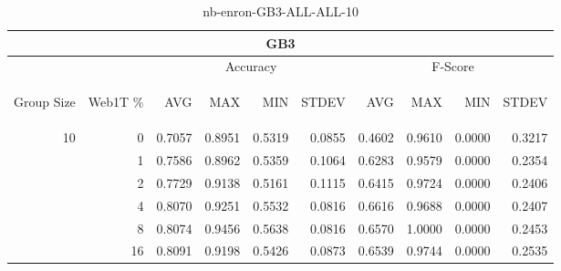 \begin{center}
\begin{table}[htbp]
\begin{tabular}{ | r | r | r | r | r | r | r | r | r | r |}
\hline
\multicolumn{10}{|c|}{GB3}\\
\hline
 & & \multicolumn{4}{|c|}{Accuracy} & \multicolumn{4}{|c|}{F-Score}\\ \cline{3-10}
\begin{sideways}Group Size\end{sideways} & \begin{sideways}Web1T \%\end{sideways} & \begin{sideways}AVG\end{sideways} & \begin{sideways}MAX\end{sideways} & \begin{sideways}MIN\end{sideways} & \begin{sideways}STDEV\end{sideways} & \begin{sideways}AVG\end{sideways} & \begin{sideways}MAX\end{sideways} & \begin{sideways}MIN\end{sideways} & \begin{sideways}STDEV\end{sideways}\\
\hline
\multirow{5}{*}{10}
 & 0 & 0.7057 & 0.8951 & 0.5319 & 0.0855 & 0.4602 & 0.9610 & 0.0000 & 0.3217\\ \cline{2-10}
 & 1 & 0.7586 & 0.8962 & 0.5359 & 0.1064 & 0.6283 & 0.9579 & 0.0000 & 0.2354\\ \cline{2-10}
 & 2 & 0.7729 & 0.9138 & 0.5161 & 0.1115 & 0.6415 & 0.9724 & 0.0000 & 0.2406\\ \cline{2-10}
 & 4 & 0.8070 & 0.9251 & 0.5532 & 0.0816 & 0.6616 & 0.9688 & 0.0000 & 0.2407\\ \cline{2-10}
 & 8 & 0.8074 & 0.9456 & 0.5638 & 0.0816 & 0.6570 & 1.0000 & 0.0000 & 0.2453\\ \cline{2-10}
 & 16 & 0.8091 & 0.9198 & 0.5426 & 0.0873 & 0.6539 & 0.9744 & 0.0000 & 0.2535\\ \cline{2-10}
\hline
\end{tabular}
\caption{nb-enron-GB3-ALL-ALL-10}
\label{table:nb-enron-GB3-ALL-ALL-10}
\end{table}
\end{center}


